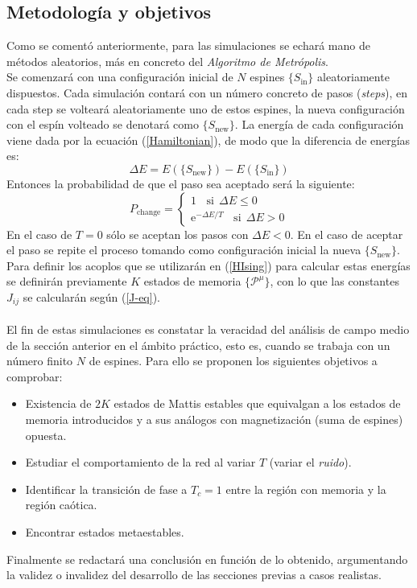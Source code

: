 \documentclass[titlepage,12pt]{article}
\numberwithin{equation}{section}
\begin{document}
	\subsection{Metodología y objetivos}
	Como se comentó anteriormente, para las simulaciones se echará mano de métodos aleatorios, más en concreto del \textit{Algoritmo de Metrópolis}. \\
	Se comenzará con una configuración inicial de $N$ espines $\{ S_{\text{in}} \}$ aleatoriamente dispuestos. 
	Cada simulación contará con un número concreto de pasos (\textit{steps}), en cada step se volteará aleatoriamente uno de estos espines, la nueva configuración con el espín volteado se denotará como $\{ S_{\text{new}}\}$. La energía de cada configuración viene dada por la ecuación (\ref{Hamiltonian}), de modo que la diferencia de energías es:
	\begin{equation}
	    \Delta E = E(\{S_{\text{new}}\}) - E(\{S_{\text{in}}\})
	\end{equation}
	Entonces la probabilidad de que el paso sea aceptado será la siguiente:
	\begin{equation}
	    P_{\text{change}} = \left\{
\begin{aligned}
    1 \ \ \ \ \text{si} \ \ \Delta E \leq 0 \\
    \text{e}^{-\Delta E/T} \ \ \ \ \text{si} \ \ \Delta E > 0
\end{aligned}
\right.
    \end{equation}
En el caso de $T = 0$ sólo se aceptan los pasos con $\Delta E < 0$. En el caso de aceptar el paso se repite el proceso tomando como configuración inicial la nueva $\{ S_{\text{new}} \}$.
\\
Para definir los acoplos que se utilizarán en (\ref{HIsing}) para calcular estas energías se definirán previamente $K$ estados de memoria $\{\mathcal{P}^{\mu}\}$, con lo que las constantes $J_{ij}$ se calcularán según (\ref{J-eq}).
\\
\\
El fin de estas simulaciones es constatar la veracidad del análisis de campo medio de la sección anterior en el ámbito práctico, esto es, cuando se trabaja con un número finito $N$ de espines. Para ello se proponen los siguientes objetivos a comprobar:
\begin{itemize}
    \item Existencia de $2K$ estados de Mattis estables que equivalgan a los estados de memoria introducidos y a sus análogos con magnetización (suma de espines) opuesta.
    \item Estudiar el comportamiento de la red al variar $T$ (variar el \textit{ruido}).
    \item Identificar la transición de fase a $T_{c} = 1$ entre la región con memoria y la región caótica.
    \item Encontrar estados metaestables.
\end{itemize}
Finalmente se redactará una conclusión en función de lo obtenido, argumentando la validez o invalidez del desarrollo de las secciones previas a casos realistas.
\end{document}
